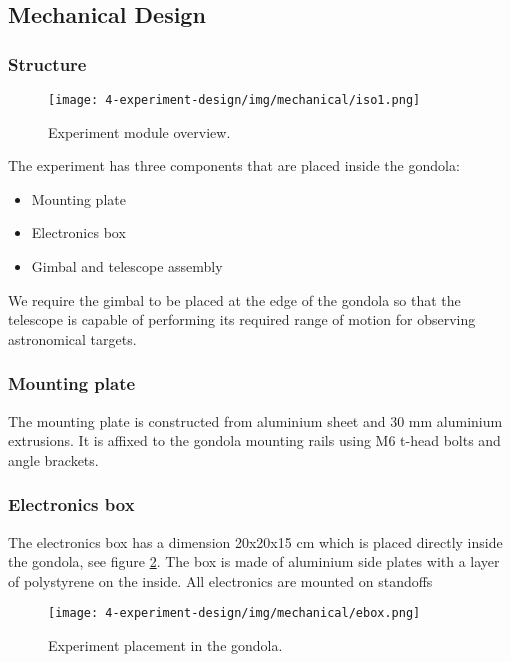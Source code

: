 \newpage
\subsection{Mechanical Design} \label{Mechanical_Design}
\label{sec:mechanical-design}

\subsubsection{Structure}

\begin{figure}[H]
	\centering 
	\texttt{[image: 4-experiment-design/img/mechanical/iso1.png]}
	\caption{Experiment module overview.}
	\label{fig::mechanical::iso1}
\end{figure}

\label{sec:4.4.1}
The experiment has three components that are placed inside the gondola:
\begin{itemize}
  \item Mounting plate    
  \item Electronics box
  \item Gimbal and telescope assembly
\end{itemize}

We require the gimbal to be placed at the edge of the gondola so that the telescope is capable of performing its required range of motion for observing astronomical targets.



\subsubsection{Mounting plate}

The mounting plate is constructed from aluminium sheet and 30 mm aluminium extrusions. It is affixed to the gondola mounting rails using M6 t-head bolts and angle brackets. 

\subsubsection{Electronics box}
\label{sec:4.4.2}

The electronics box has a dimension 20x20x15 cm which is placed directly inside the gondola, see figure \ref{fig::mechanical::ebox}. The box is made of aluminium side plates with a layer of polystyrene on the inside. All electronics are mounted on standoffs 

\begin{figure}[H]
	\centering 
	\texttt{[image: 4-experiment-design/img/mechanical/ebox.png]}
	\caption{Experiment placement in the gondola.}
	\label{fig::mechanical::ebox}
\end{figure}


